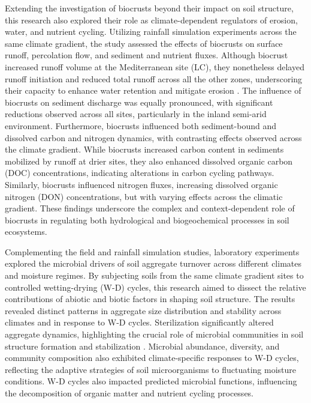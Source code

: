 Extending the investigation of biocrusts beyond their impact on soil structure, this research also explored their role as climate-dependent regulators of erosion, water, and nutrient cycling. Utilizing rainfall simulation experiments across the same climate gradient, the study assessed the effects of biocrusts on surface runoff, percolation flow, and sediment and nutrient fluxes. Although biocrust increased runoff volume at the Mediterranean site (LC), they nonetheless delayed runoff initiation and reduced total runoff across all the other zones, underscoring their capacity to enhance water retention and mitigate erosion \citep{Kidron2022}. The influence of biocrusts on sediment discharge was equally pronounced, with significant reductions observed across all sites, particularly in the inland semi-arid environment. Furthermore, biocrusts influenced both sediment-bound and dissolved carbon and nitrogen dynamics, with contrasting effects observed across the climate gradient. While biocrusts increased carbon content in sediments mobilized by runoff at drier sites, they also enhanced dissolved organic carbon (DOC) concentrations, indicating alterations in carbon cycling pathways. Similarly, biocrusts influenced nitrogen fluxes, increasing dissolved organic nitrogen (DON) concentrations, but with varying effects across the climatic gradient. These findings underscore the complex and context-dependent role of biocrusts in regulating both hydrological and biogeochemical processes in soil ecosystems.

Complementing the field and rainfall simulation studies, laboratory experiments explored the microbial drivers of soil aggregate turnover across different climates and moisture regimes. By subjecting soils from the same climate gradient sites to controlled wetting-drying (W-D) cycles, this research aimed to dissect the relative contributions of abiotic and biotic factors in shaping soil structure. The results revealed distinct patterns in aggregate size distribution and stability across climates and in response to W-D cycles. Sterilization significantly altered aggregate dynamics, highlighting the crucial role of microbial communities in soil structure formation and stabilization \citep{Six2004}. Microbial abundance, diversity, and community composition also exhibited climate-specific responses to W-D cycles, reflecting the adaptive strategies of soil microorganisms to fluctuating moisture conditions. W-D cycles also impacted predicted microbial functions, influencing the decomposition of organic matter and nutrient cycling processes.

